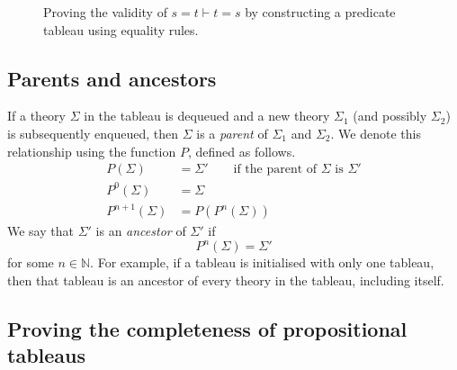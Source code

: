 \begin{figure}[H]
    \centering
    \caption{Proving the validity of \(s = t \vdash t = s\) by constructing a predicate tableau using equality rules.}
    \label{fig:Ch05-eq-rule-tableau}
\end{figure}




\subsection{Parents and ancestors}

If a theory \(\Sigma\) in the tableau is dequeued and a new theory \(\Sigma_1\) (and possibly \(\Sigma_2\)) is subsequently enqueued, then \(\Sigma\) is a \emph{parent} of \(\Sigma_1\) and \(\Sigma_2\). We denote this relationship using the function \(P\), defined as follows.
%
\begin{align*}
    P(\Sigma) &= \Sigma' \hspace{2em} \text{if the parent of } \Sigma \text{ is } \Sigma'\\
    P^0(\Sigma) &= \Sigma\\
    P^{n+1} (\Sigma) &= P(P^n (\Sigma))
\end{align*}
%
We say that \(\Sigma'\) is an \emph{ancestor} of \(\Sigma'\) if
%
\[P^n (\Sigma) = \Sigma'\]
%
for some \(n \in \mathbb{N}\). For example, if a tableau is initialised with only one tableau, then that tableau is an ancestor of every theory in the tableau, including itself.



\subsection{Proving the completeness of propositional tableaus}

